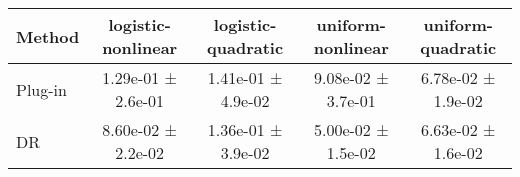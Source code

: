 \begin{tabular}{lcccc}
\toprule
Method & logistic-nonlinear & logistic-quadratic & uniform-nonlinear & uniform-quadratic \\
\midrule
Plug-in & 1.29e-01 ± 2.6e-01 & 1.41e-01 ± 4.9e-02 & 9.08e-02 ± 3.7e-01 & 6.78e-02 ± 1.9e-02 \\
DR & 8.60e-02 ± 2.2e-02 & 1.36e-01 ± 3.9e-02 & 5.00e-02 ± 1.5e-02 & 6.63e-02 ± 1.6e-02 \\
\bottomrule
\end{tabular}
